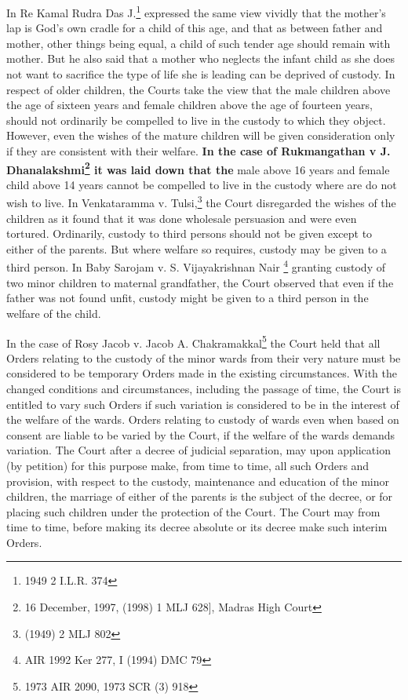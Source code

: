 \begin{multicols}{2}
\vspace{-.1cm}

\noi
In Re Kamal Rudra Das J.\footnote{1949 2 I.L.R. 374} expressed the same view vividly that the mother's lap is God's own
cradle for a child of this age, and that as between father and mother, other things being equal, a
child of such tender age should remain with mother. But he also said that a mother who neglects
the infant child as she does not want to sacrifice the type of life she is leading can be deprived of
custody. In respect of older children, the Courts take the view that the male children above the
age of sixteen years and female children above the age of fourteen years, should not ordinarily be
compelled to live in the custody to which they object. However, even the wishes of the mature
children will be given consideration only if they are consistent with their welfare. \textbf{In the case
of Rukmangathan v J. Dhanalakshmi\footnote{16 December, 1997, (1998) 1 MLJ 628], Madras High Court} it was laid down that the} male above 16 years and female child above 14 years cannot be compelled to live in the custody where are do not wish to live. In Venkataramma v. Tulsi,\footnote{(1949) 2 MLJ 802} the Court disregarded the wishes of the children as it found that it was done wholesale persuasion and were even tortured. Ordinarily,
custody to third persons should not be given except to either of the parents. But where welfare so
requires, custody may be given to a third person. In Baby Sarojam v. S. Vijayakrishnan Nair \footnote{AIR 1992 Ker 277, I (1994) DMC 79} granting custody of two minor children to maternal grandfather, the Court observed that even if the father was not found unfit, custody might be given to a third person in the welfare of the child.

\vspace{-.1cm}

\noi
In the case of Rosy Jacob v. Jacob A. Chakramakkal\footnote{1973 AIR 2090, 1973 SCR (3) 918} the Court held that all Orders relating to the custody of the minor wards from their very nature must be considered to be temporary Orders made in the existing circumstances. With the changed conditions and circumstances, including the passage of time, the Court is entitled to vary such Orders if such variation is considered to be in the interest of the welfare of the wards. Orders relating to custody of wards even when based on consent are liable to be varied by the Court, if the welfare of the wards demands variation. The Court after a decree of judicial separation, may upon application (by petition) for this purpose make, from time to time, all such Orders and provision, with respect to the custody, maintenance and education of the minor children, the marriage of either of the parents is the subject of the decree, or for placing such children under the protection of the Court. The Court may from time
to time, before making its decree absolute or its decree make such interim Orders.


\end{multicols}
